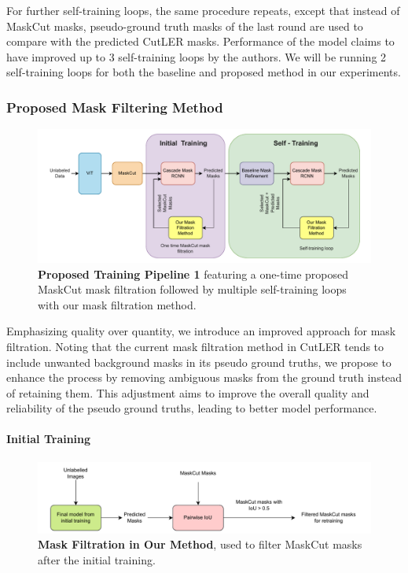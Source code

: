 For further self-training loops, the same procedure repeats, except that instead of MaskCut masks, pseudo-ground truth masks of the last round are used to compare with the predicted CutLER masks. Performance of the model claims to have improved up to 3 self-training loops by the authors. We will be running 2 self-training loops for both the baseline and proposed method in our experiments.


\subsubsection{Proposed Mask Filtering Method}
\label{section:proposed_method}

\begin{figure}
	\centering
	\includegraphics[width=1\textwidth]{Images/main/proposed_method_last.pdf}
	\caption[\textbf{Proposed Training Pipeline 1}]{\textbf{Proposed Training Pipeline 1} featuring a one-time proposed MaskCut mask filtration followed by multiple self-training loops with our mask filtration method.}
	\label{fig:proposed_training}
\end{figure}
Emphasizing quality over quantity, we introduce an improved approach for mask filtration. Noting that the current mask filtration method in CutLER tends to include unwanted background masks in its pseudo ground truths, we propose to enhance the process by removing ambiguous masks from the ground truth instead of retaining them. This adjustment aims to improve the overall quality and reliability of the pseudo ground truths, leading to better model performance.

\paragraph{Initial Training}
\begin{figure}
	\centering
	\includegraphics[width=1\textwidth]{Images/main/our_mask_filtration_1.pdf}
	\caption[\textbf{Mask Filtration in Proposed Method}]{\textbf{Mask Filtration in Our Method}, used to filter MaskCut masks after the initial training.}
	\label{fig:our_mask_filtration}
\end{figure}

